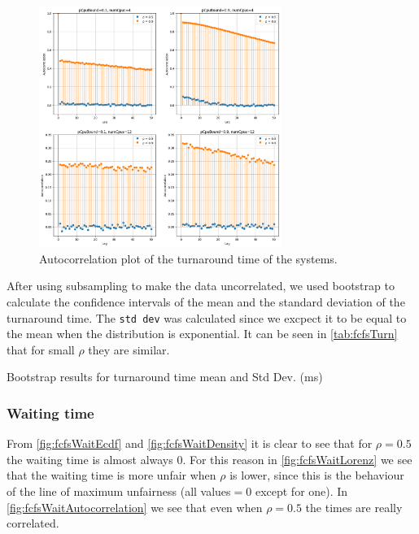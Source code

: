 \begin{figure}[H]
    \captionsetup{type=figure}
    \centering
    \includegraphics[width=0.7\textwidth]{./images/04/fcfs/turn/autocorrelation.png}
    \caption{Autocorrelation plot of the turnaround time of the systems.}
    \label{fig:fcfsTurnAutocorrelation}
\end{figure}

\newpage
After using subsampling to make the data uncorrelated, we used bootstrap to calculate the confidence intervals of the mean and the standard deviation of the turnaround time. The \texttt{std dev} was calculated since we excpect it to be equal to the mean when the distribution is exponential. It can be seen in \cref{tab:fcfsTurn} that for small $\rho$ they are similar.

\begin{table}[H]
    \centering
    \scriptsize
    
    \caption{Bootstrap results for turnaround time mean and Std Dev. (ms)}
    \label{tab:fcfsTurn}
\end{table}


\subsubsection{Waiting time}

From \cref{fig:fcfsWaitEcdf} and \cref{fig:fcfsWaitDensity} it is clear to see that for $\rho = 0.5$ the waiting time is almost always $0$. For this reason in \cref{fig:fcfsWaitLorenz} we see that the waiting time is more unfair when $\rho$ is lower, since this is the behaviour of the line of maximum unfairness (all values$ = 0$ except for one). In \cref{fig:fcfsWaitAutocorrelation} we see that even when $\rho = 0.5$ the times are really correlated.

